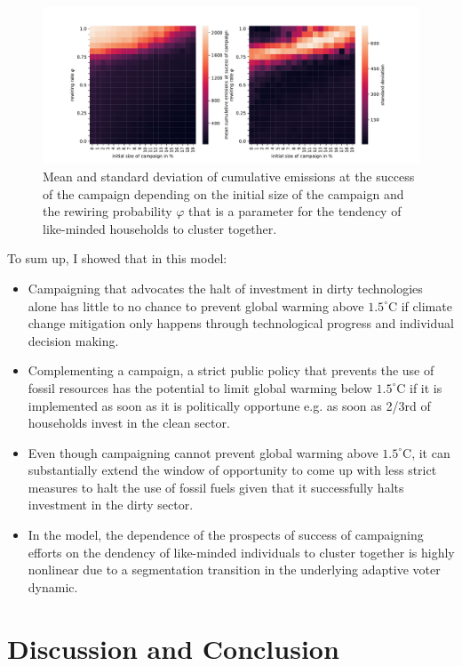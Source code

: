\begin{figure}[t]
    \centering
    \includegraphics[width = \textwidth]{figures/campaign_vs_phi.pdf}
    \caption{Mean and standard deviation of cumulative emissions at the success of the campaign depending on the initial size of the campaign and the rewiring probability $\varphi$ that is a parameter for the tendency of like-minded households to cluster together. }
    \label{fig:campaign_phi}
\end{figure}

To sum up, I showed that in this model:
\begin{itemize}
  \item Campaigning that advocates the halt of investment in dirty technologies alone has little to no chance to prevent global warming above $1.5^{\circ}$C if climate change mitigation only happens through technological progress and individual decision making.
  \item Complementing a campaign, a strict public policy that prevents the use of fossil resources has the potential to limit global warming below $1.5^{\circ}$C if it is implemented as soon as it is politically opportune e.g. as soon as 2/3rd of households invest in the clean sector.
  \item Even though campaigning cannot prevent global warming above $1.5^{\circ}$C, it can substantially extend the window of opportunity to come up with less strict measures to halt the use of fossil fuels given that it successfully halts investment in the dirty sector.
  \item In the model, the dependence of the prospects of success of campaigning efforts on the dendency of like-minded individuals to cluster together is highly nonlinear due to a segmentation transition in the underlying adaptive voter dynamic.
\end{itemize}

\section{Discussion and Conclusion}
\label{sec:heuristics_conclusion}

